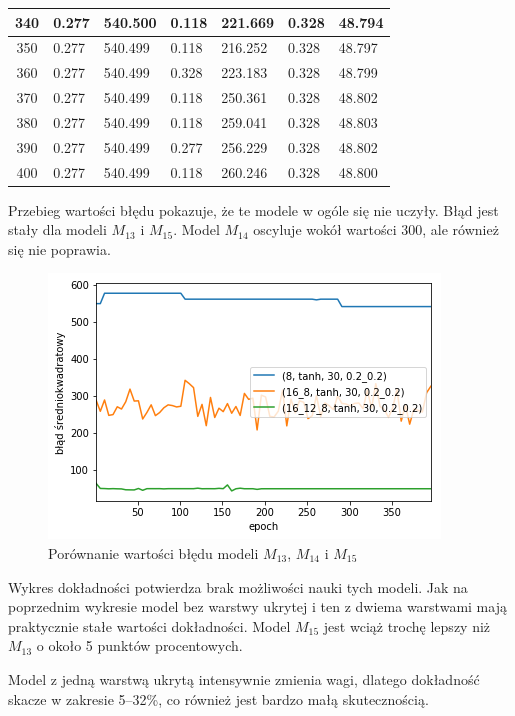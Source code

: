 \begin{longtable}{|c|l|l|l|l|l|l|}
        340 & 0.277 & 540.500 & 0.118 & 221.669 & 0.328 & 48.794 \\ \hline
        350 & 0.277 & 540.499 & 0.118 & 216.252 & 0.328 & 48.797 \\ \hline
        360 & 0.277 & 540.499 & 0.328 & 223.183 & 0.328 & 48.799 \\ \hline
        370 & 0.277 & 540.499 & 0.118 & 250.361 & 0.328 & 48.802 \\ \hline
        380 & 0.277 & 540.499 & 0.118 & 259.041 & 0.328 & 48.803 \\ \hline
        390 & 0.277 & 540.499 & 0.277 & 256.229 & 0.328 & 48.802 \\ \hline
        400 & 0.277 & 540.499 & 0.118 & 260.246 & 0.328 & 48.800 \\ \hline
    \end{longtable}

    Przebieg wartości błędu pokazuje, że te modele w ogóle się nie uczyły.
    Błąd jest stały dla modeli $M_{13}$ i $M_{15}$.
    Model $M_{14}$ oscyluje wokół wartości 300, ale również się nie poprawia.

    \begin{figure}[htp]
        \centering
        \includegraphics[scale=0.8]{./img/arch-error-tanh.png}
        \caption{Porównanie wartości błędu modeli $M_{13}$, $M_{14}$ i $M_{15}$}
    \end{figure}

    Wykres dokładności potwierdza brak możliwości nauki tych modeli.
    Jak na poprzednim wykresie model bez warstwy ukrytej i ten z dwiema warstwami mają praktycznie stałe wartości dokładności.
    Model $M_{15}$ jest wciąż trochę lepszy niż $M_{13}$ o około 5 punktów procentowych.

    Model z jedną warstwą ukrytą intensywnie zmienia wagi, dlatego dokładność skacze w zakresie 5--32\%, co również jest bardzo małą skutecznością.

